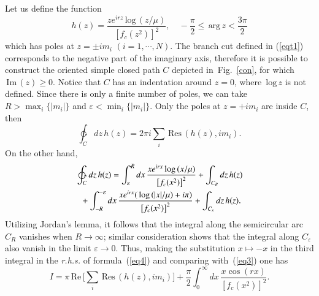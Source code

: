 \documentclass[aps,prd,a4paper,twocolumn,showpacs,showkeys,preprintnumbers,amsmath,amssymb,nofootinbib]{revtex4-2}
\numberwithin{equation}{section}
\def\beq{\begin{equation}}
\def\eeq{\end{equation}}
\def\ln{\,\mbox{log}\,}
\def\Res{\,\mbox{Res}\,}
\renewcommand{\Re}{\,\mbox{Re}\,}
\renewcommand{\Im}{\,\mbox{Im}\,}
\newcommand{\eq}[1]{(\ref{#1})}
\newcommand{\n}[1]{\label{#1}}
\def\vp{\varepsilon}
\begin{document}
Let us define the function
\beq
\n{eqt1}
h(z) = \frac{z e^{irz} \ln(z/\mu)}{\left[ f_c (z^2)\right] ^2}, 
\quad - \frac{\pi}{2} \leqslant \,\text{arg}\, z < \frac{3\pi}{2}
\eeq
which has poles at $z = \pm i m_i$ $(i = 1,\cdots,N)$. 
%
The branch cut defined in \eq{eqt1} corresponds to the negative part of the imaginary axis, therefore it is possible to construct the oriented simple closed
path $C$ depicted in~Fig.~\ref{con}, for which $\Im (z) \geqslant 0$. Notice that $C$ has an indentation around $z=0$, where $\ln z$ is not defined. Since there is only a finite number of poles, we can take $R > \max_i\lbrace |m_i| \rbrace$ and $\vp < \min_i \lbrace |m_i| \rbrace$. Only the poles at $z=+ i m_i$ are inside $C$, then
%
\beq
\n{eq3}
\ointctrclockwise_C dz\, h(z) = 2 \pi i \sum_{i} \Res (h(z),i m_i).
\eeq
On the other hand,
\begin{equation}
\begin{split}
\n{eq4}
&
\ointctrclockwise_C dz \, h (z) =  \int_\varepsilon^R dx \, \frac{x e^{irx} \ln (x/\mu)}{\left[ f_c (x^2)\right] ^2} 
+ \int_{C_R} dz \, h(z)
\\
& \hspace{2.0 mm}
+ \int_{-R}^{-\varepsilon} dx \, \frac{x e^{irx} (\ln (|x|/\mu) + i \pi)}{\left[ f_c (x^2)\right] ^2} 
+ \int_{C_\varepsilon} dz \, h(z)
.
\end{split}
\end{equation}
Utilizing Jordan's lemma, it follows that the integral along the semicircular arc $C_R$ vanishes when $R \to \infty$; similar consideration shows that the integral along $C_\vp$ also vanish in the limit $\vp \to 0$. Thus, making the substitution $x \mapsto - x$ in the third integral in the {\it r.h.s.} of formula~\eq{eq4} and comparing with~\eq{eq3} one has 
\beq
\n{K-an}
I
= \pi \Re \Big[ \sum_{i} {\Res (h(z), i m_i) } \Big] +  \frac{\pi}{2} \int_0^\infty dx \, \frac{x \cos (rx)}{\left[ f_c (x^2)\right] ^2} 
.
\eeq
\end{document}
